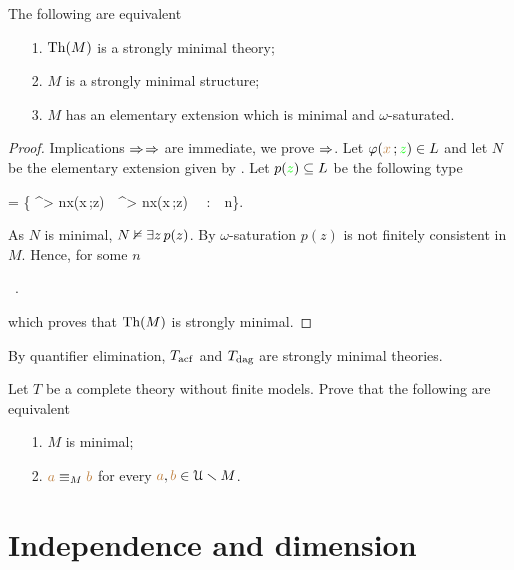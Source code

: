 \begin{proposition}\label{prop_fmequivalenzadefinizioni}
The following are equivalent
\begin{itemize}
\item[1.] $\textrm{Th}(M)$ is a strongly minimal theory;
\item[2.] $M$ is a strongly minimal structure; 
\item[3.] $M$ has an elementary extension which is minimal and $\omega$-saturated.
\end{itemize}
\end{proposition}
\begin{proof}
Implications $\Rightarrow$$\Rightarrow$ are immediate, we prove $\Rightarrow$.
Let $\varphi({\color{brown} x}\,;{\color{green} z})\in L$ and let $N$ be the elementary extension given by .
Let $p({\color{green} z})\subseteq L$ be the following type

{=}
{\Big\{ \E^{> n}{\mr x}\;\phi({\mr x}\,;{\gr z})\ \wedge\ \E^{> n}{\mr x}\;\neg\phi({\mr x}\,;{\gr z}) \ \ :\ \ n\in\omega\Big\}.}

As $N$ is minimal, $N\nvDash \exists z\,p(z)$.
By $\omega$-saturation $p(z)$ is not finitely consistent in $M$.
Hence, for some $n$ 

{\models}
{\ .}

which proves that $\textrm{Th}(M)$ is strongly minimal.
\end{proof}

By quantifier elimination, $T_{\rm acf}$ and $T_{\rm dag}$ are strongly minimal theories.

\begin{exercise}
Let $T$ be a complete theory without finite models.
Prove that the following are equivalent
\begin{itemize}
\item[1.] $M$ is minimal;
\item[2.] ${\color{brown} a}\equiv_M{\color{brown} b}$ for every ${\color{brown} a}, {\color{brown} b}\in \EuScript U\smallsetminus M$.\QED
\end{itemize}
\end{exercise}



\section{Independence and dimension}
\def\medrel#1{\parbox[t]{5ex}{$\displaystyle\hfil #1$}}
\def\ceq#1#2#3{\parbox{35ex}{$\displaystyle #1$}\medrel{#2}$\displaystyle  #3$}


